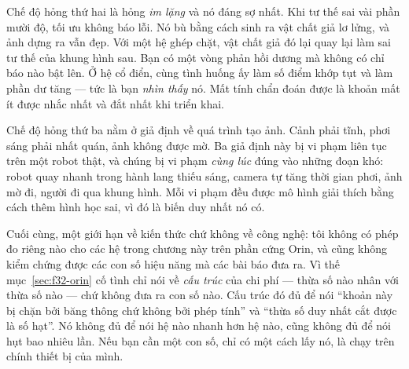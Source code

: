 \documentclass[../../deep_learning.tex]{subfiles}
\begin{document}
Chế độ hỏng thứ hai là hỏng \emph{im lặng} và nó đáng sợ nhất. Khi tư thế sai vài phần mười độ, tối ưu không báo lỗi. Nó bù bằng cách sinh ra vật chất giả lơ lửng, và ảnh dựng ra vẫn đẹp. Với một hệ ghép chặt, vật chất giả đó lại quay lại làm sai tư thế của khung hình sau. Bạn có một vòng phản hồi dương mà không có chỉ báo nào bật lên. Ở hệ cổ điển, cùng tình huống ấy làm số điểm khớp tụt và làm phần dư tăng --- tức là bạn \emph{nhìn thấy} nó. Mất tính chẩn đoán được là khoản mất ít được nhắc nhất và đắt nhất khi triển khai.

Chế độ hỏng thứ ba nằm ở giả định về quá trình tạo ảnh. Cảnh phải tĩnh, phơi sáng phải nhất quán, ảnh không được mờ. Ba giả định này bị vi phạm liên tục trên một robot thật, và chúng bị vi phạm \emph{cùng lúc} đúng vào những đoạn khó: robot quay nhanh trong hành lang thiếu sáng, camera tự tăng thời gian phơi, ảnh mờ đi, người đi qua khung hình. Mỗi vi phạm đều được mô hình giải thích bằng cách thêm hình học sai, vì đó là biến duy nhất nó có.

Cuối cùng, một giới hạn về kiến thức chứ không về công nghệ: tôi không có phép đo riêng nào cho các hệ trong chương này trên phần cứng Orin, và cũng không kiểm chứng được các con số hiệu năng mà các bài báo đưa ra. Vì thế mục~\ref{sec:f32-orin} cố tình chỉ nói về \emph{cấu trúc} của chi phí --- thừa số nào nhân với thừa số nào --- chứ không đưa ra con số nào. Cấu trúc đó đủ để nói ``khoản này bị chặn bởi băng thông chứ không bởi phép tính'' và ``thừa số duy nhất cắt được là số hạt''. Nó không đủ để nói hệ nào nhanh hơn hệ nào, cũng không đủ để nói hụt bao nhiêu lần. Nếu bạn cần một con số, chỉ có một cách lấy nó, là chạy trên chính thiết bị của mình.
\end{document}

